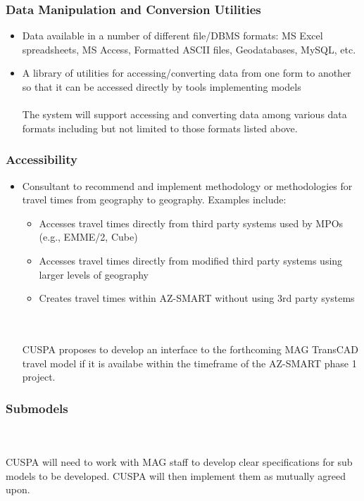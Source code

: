 \documentclass[titlepage]{article}
\begin{document}
\subsubsection{Data Manipulation and Conversion Utilities}
\begin{itemize}
	\item Data available in a number of different file/DBMS formats: MS Excel spreadsheets, MS Access, Formatted ASCII files, Geodatabases, MySQL, etc.
	\item A library of utilities for accessing/converting data from one form to another so that it can be accessed directly by tools implementing models
	\\\\
	The system will support accessing and converting data among various data formats including but not limited to those formats listed above.
\end{itemize}

\subsubsection{Accessibility}
\begin{itemize}
	\item Consultant to recommend and implement methodology or methodologies for travel times from geography to geography. Examples include:
		\begin{itemize}
			\item Accesses travel times directly from third party systems used by MPOs (e.g., EMME/2, Cube)
			\item Accesses travel times directly from modified third party systems using larger levels of geography
			\item Creates travel times within AZ-SMART without using 3rd party systems
		\end{itemize}
		\\\\
		CUSPA proposes to develop an interface to the forthcoming MAG TransCAD travel model if it is availabe within the timeframe of the AZ-SMART phase 1 project.
\end{itemize}

\subsubsection{Submodels}
\\\\
CUSPA will need to work with MAG staff to develop clear specifications for sub models to be developed.  CUSPA will then implement them as mutually agreed upon.
\end{document}
